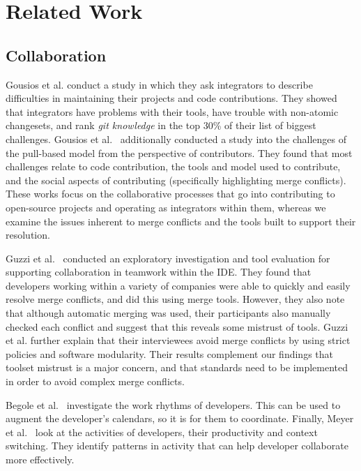 
\section{Related Work}\label{related_work}

\subsection{Collaboration}

Gousios et al. \cite{integrator_perspective} conduct a study in which they ask integrators to describe difficulties in maintaining their projects and code contributions. 
They showed that integrators have problems with their tools, have trouble with non-atomic changesets, and rank \textit{git knowledge} in the top 30\% of their list of biggest challenges. 
Gousios et al.~\cite{gousios2016work} additionally conducted a study into the challenges of the pull-based model from the perspective of contributors. 
They found that most challenges relate to code contribution, the tools and model used to contribute, and the social aspects of contributing (specifically highlighting merge conflicts).
These works focus on the collaborative processes that go into contributing to open-source projects and operating as integrators within them, whereas we examine the issues inherent to merge conflicts and the tools built to support their resolution.

Guzzi et al.~\cite{Guzzi2015} conducted an exploratory investigation and tool evaluation for supporting collaboration in teamwork within the IDE.
They found that developers working within a variety of companies were able to quickly and easily resolve merge conflicts, and did this using merge tools.
However, they also note that although automatic merging was used, their participants also manually checked each conflict and suggest that this reveals some mistrust of tools.
Guzzi et al. further explain that their interviewees avoid merge conflicts by using strict policies and software modularity.
Their results complement our findings that toolset mistrust is a major concern, and that standards need to be implemented in order to avoid complex merge conflicts.

Begole et al.~\cite{begole_work_2002} investigate the work rhythms of developers. 
This can be used to augment the developer's calendars, so it is for them to coordinate.
Finally, Meyer et al.~\cite{meyer_work_2017} look at the activities of developers, their productivity and context switching.
They identify patterns in activity that can help developer collaborate more effectively. 

